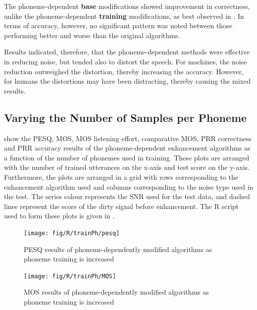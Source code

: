 The phoneme-dependent \textbf{base} modifications showed improvement
in correctness, unlike the phoneme-dependent \textbf{training} modifications,
as best observed in . In terms of
accuracy, however, no significant pattern was noted between those
performing better and worse than the original algorithms.

Results indicated, therefore, that the phoneme-dependent methods were
effective in reducing noise, but tended also to distort the speech.
For machines, the noise reduction outweighed the distortion, thereby
increasing the accuracy. However, for humans the distortions may have
been distracting, thereby causing the mixed results.


\subsection{\label{sub:Varying-Phns}Varying the Number of Samples per Phoneme}

show the \ac{PESQ}, \ac{MOS}, \ac{MOS} listening effort, comparative
\ac{MOS}, \ac{PRR} correctness and \ac{PRR} accuracy results of
the phoneme-dependent enhancement algorithms as a function of the
number of phonemes used in training. These plots are arranged with
the number of trained utterances on the x-axis and test score on the
y-axis. Furthermore, the plots are arranged in a grid with rows corresponding
to the enhancement algorithm used and columns corresponding to the
noise type used in the test. The series colour represents the \ac{SNR}
used for the test data, and dashed lines represent the score of the
dirty signal before enhancement. The R script used to form these plots
is given in .

\begin{figure}[p]
\noindent \begin{centering}
\texttt{[image: fig/R/trainPh/pesq]}
\par\end{centering}

\protect\caption{\label{fig:vary-train-phn-pesq}\acs{PESQ} results of phoneme-dependently
modified algorithms as phoneme training is increased}
\end{figure}


\begin{figure}[p]
\noindent \begin{centering}
\texttt{[image: fig/R/trainPh/MOS]}
\par\end{centering}

\protect\caption{\label{fig:vary-train-phn-mos}\acs{MOS} results of phoneme-dependently
modified algorithms as phoneme training is increased}
\end{figure}


